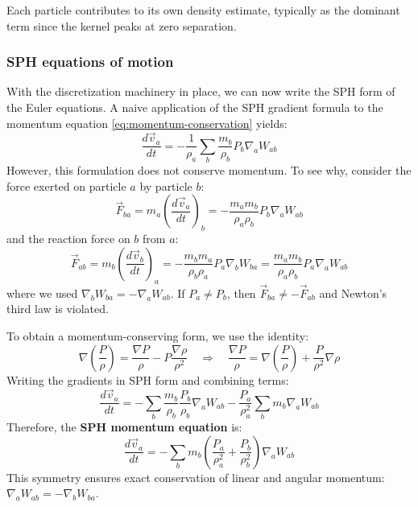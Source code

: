 \vspace{-0.4em}

\begin{tipsblock}
    Each particle contributes to its own density estimate, typically as the dominant term since the kernel peaks at zero separation.
\end{tipsblock}

\subsubsection{SPH equations of motion}

With the discretization machinery in place, we can now write the SPH form of the Euler equations. A naive application of the SPH gradient formula to the momentum equation \eqref{eq:momentum-conservation} yields:
$$
\dfrac{d\vec{v}_a}{dt} = -\dfrac{1}{\rho_a} \sum_b \dfrac{m_b}{\rho_b} P_b \nabla_a W_{ab}
$$
However, this formulation does not conserve momentum. To see why, consider the force exerted on particle $a$ by particle $b$:
$$
\vec{F}_{ba} = m_a \left( \dfrac{d\vec{v}_a}{dt} \right)_b = -\dfrac{m_a m_b}{\rho_a \rho_b} P_b \nabla_a W_{ab}
$$
and the reaction force on $b$ from $a$:
$$
\vec{F}_{ab} = m_b \left( \dfrac{d\vec{v}_b}{dt} \right)_a = -\dfrac{m_b m_a}{\rho_b \rho_a} P_a \nabla_b W_{ba} = \dfrac{m_a m_b}{\rho_a \rho_b} P_a \nabla_a W_{ab}
$$
where we used $\nabla_b W_{ba} = -\nabla_a W_{ab}$. If $P_a \neq P_b$, then $\vec{F}_{ba} \neq -\vec{F}_{ab}$ and Newton's third law is violated.

To obtain a momentum-conserving form, we use the identity:
$$
\nabla \left( \dfrac{P}{\rho} \right) = \dfrac{\nabla P}{\rho} - P \dfrac{\nabla \rho}{\rho^2}
\quad \Longrightarrow \quad
\dfrac{\nabla P}{\rho} = \nabla \left( \dfrac{P}{\rho} \right) + \dfrac{P}{\rho^2} \nabla \rho
$$
Writing the gradients in SPH form and combining terms:
$$
\dfrac{d\vec{v}_a}{dt} = - \sum_b \dfrac{m_b}{\rho_b} \dfrac{P_b}{\rho_b} \nabla_a W_{ab} -\dfrac{P_a}{\rho_a^2} \sum_b m_b \nabla_a W_{ab}
$$
Therefore, the \textbf{SPH momentum equation} is:
$$
\boxed{
\dfrac{d\vec{v}_a}{dt} = -\sum_b m_b \left( \dfrac{P_a}{\rho_a^2} + \dfrac{P_b}{\rho_b^2} \right) \nabla_a W_{ab}
}
$$
This symmetry ensures exact conservation of linear and angular momentum: $\nabla_a W_{ab} = -\nabla_b W_{ba}$.

